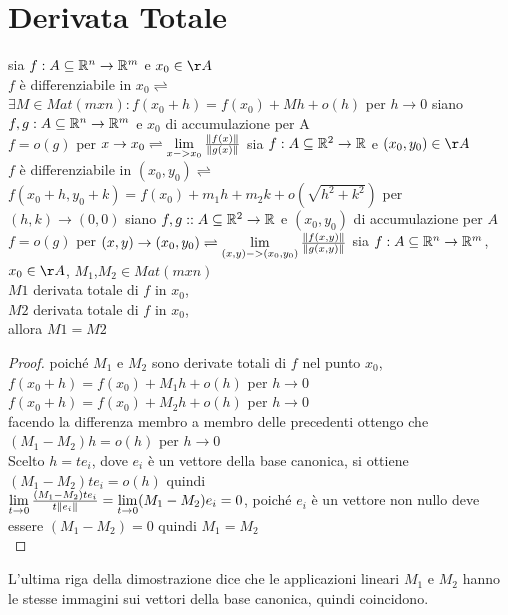 \section{Derivata Totale}
sia $f:A\subseteq \mathbb{R}^n\rightarrow \mathbb{R}^m$ e $x_0\in\AA$ \\
$f$ è differenziabile in $x_0\rightleftharpoons$ $\exists M\in Mat(mxn) : f(x_0+h) = f(x_0)+Mh+o(h)$ per $h\rightarrow 0$ 
siano $f,g : A\subseteq \mathbb{R}^n\rightarrow \mathbb{R}^m$ e $x_0$ di accumulazione per A \\
$f=o(g)$ per $x\rightarrow x_0 \rightleftharpoons \lim\limits_{x->x_0}\frac{\left\|f(x)\right\| }{\left\|g(x)\right\| }$
sia $f:A\subseteq \mathbb{R}^2\rightarrow \mathbb{R}$ e $(x_0,y_0)\in\AA$ \\
$f$ è differenziabile in $(x_0,y_0)\rightleftharpoons$ $f(x_0+h,y_0+k) = f(x_0)+m_1h+m_2k+o(\sqrt{h^2+k^2})$ per $(h,k)\rightarrow (0,0)$
siano $f,g : :A\subseteq \mathbb{R}^2\rightarrow \mathbb{R}$ e $(x_0,y_0)$ di accumulazione per $A$ \\
$f=o(g)$ per $(x,y)\rightarrow (x_0,y_0) \rightleftharpoons \lim\limits_{(x,y)->(x_0,y_0)}\frac{\left\|f(x,y)\right\| }{\left\|g(x,y)\right\| }$
sia $f:A\subseteq \mathbb{R}^n\rightarrow \mathbb{R}^m$, $x_0\in\AA$, $M_1$,$M_2\in Mat(mxn)$\\
$M1$ derivata totale di $f$ in $x_0$,\\
$M2$ derivata totale di $f$ in $x_0$,\\
allora $M1=M2$\\
\begin{proof}
	poiché $M_1$ e $M_2$ sono derivate totali di $f$ nel punto $x_0$,\\
	$f(x_0+h) = f(x_0)+M_1h+o(h)$ per $h\rightarrow 0$\\
	$f(x_0+h) = f(x_0)+M_2h+o(h)$ per $h\rightarrow 0$\\
	facendo la differenza membro a membro delle precedenti ottengo che $(M_1-M_2)h=o(h)$ per $h\rightarrow 0$\\
	Scelto $h=te_i$, dove $e_i$ è un vettore della base canonica, si ottiene $(M_1-M_2)te_i=o(h)$ quindi\\
	$\lim\limits_{t\rightarrow 0}\frac{(M_1-M_2)te_i}{t\left\|e_i\right\| } = \lim\limits_{t\rightarrow 0}(M_1-M_2)e_i = 0$, poiché $e_i$ è un vettore non nullo deve essere $(M_1-M_2)=0$ quindi $M_1 = M_2$\\
\end{proof}
\observation
L'ultima riga della dimostrazione dice che le applicazioni lineari $M_1$ e $M_2$ hanno le stesse immagini sui vettori della base canonica, quindi coincidono.

